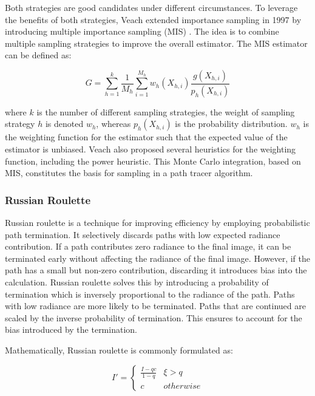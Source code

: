 Both strategies are good candidates under different circumstances. To leverage the benefits of both strategies, Veach extended importance sampling in 1997 by introducing multiple importance sampling (\gls{MIS}) \cite{veachMonteCarloLightTransport}. The idea is to combine multiple sampling strategies to improve the overall estimator. The \gls{MIS} estimator can be defined as:

\begin{equation}
  G = \sum_{h=1}^k \frac{1}{M_h}\sum_{i=1}^{M_h} w_h(X_{h,i})\frac{g(X_{h,i})}{p_h(X_{h,i})}
  \label{eq:multipleImportanceSampling}
\end{equation}

where $k$ is the number of different sampling strategies, the weight of sampling strategy $h$ is denoted $w_h$, whereas $p_h(X_{h,i})$ is the probability distribution. $w_h$ is the weighting function for the estimator such that the expected value of the estimator is unbiased. Veach also proposed several heuristics for the weighting function, including the power heuristic. This Monte Carlo integration, based on \gls{MIS}, constitutes the basis for sampling in a path tracer algorithm.

\subsubsection{Russian Roulette}
\label{ch:russianRoulette}

Russian roulette is a technique for improving efficiency by employing probabilistic path termination. It selectively discards paths with low expected radiance contribution. If a path contributes zero radiance to the final image, it can be terminated early without affecting the radiance of the final image. However, if the path has a small but non-zero contribution, discarding it introduces bias into the calculation. Russian roulette solves this by introducing a probability of termination which is inversely proportional to the radiance of the path. Paths with low radiance are more likely to be terminated. Paths that are continued are scaled by the inverse probability of termination. This ensures to account for the bias introduced by the termination.

Mathematically, Russian roulette is commonly formulated as:

\begin{equation}
  \label{eqn:russian-roulette}
  I' = \begin{cases} \frac{I-qc}{1-q} & \xi > q \\ c & otherwise \end{cases}
\end{equation}

